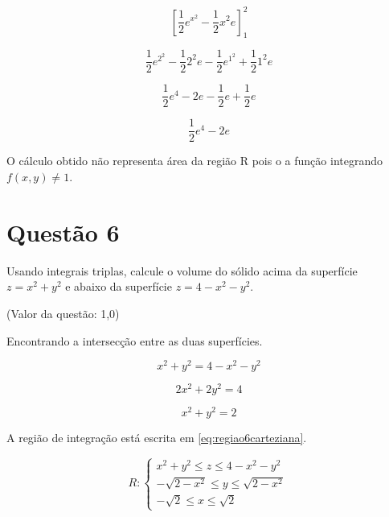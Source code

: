 \documentclass[10pt,a4paper]{article}
\begin{document}
	\begin{equation*}
		\left[ \frac{1}{2}e^{x^2} - \frac{1}{2}x^2 e \right]_1^2
	\end{equation*}
	
	\begin{equation*}
		\frac{1}{2}e^{2^2} - \frac{1}{2}2^2 e - \frac{1}{2}e^{1^2} + \frac{1}{2}1^2 e
	\end{equation*}
	
	\begin{equation*}
		\frac{1}{2}e^4 - 2 e - \frac{1}{2}e + \frac{1}{2} e
	\end{equation*}
	
	\begin{equation*}
		\frac{1}{2}e^4 - 2 e
	\end{equation*}
	
	O cálculo obtido não representa área da região R pois o a função integrando $f(x, y) \neq 1$.
	
	\section*{Questão 6}
	
	Usando integrais triplas, calcule o volume do sólido acima da superfície $ z = x^2 + y^2 $ e abaixo da superfície $ z = 4 - x^2 - y^2 $.
	
	(Valor da questão: 1,0)
	
	Encontrando a intersecção entre as duas superfícies.
	
	\begin{equation*}
		x^2 + y^2 = 4 - x^2 - y^2
	\end{equation*}
	
	\begin{equation*}
		2x^2 + 2y^2 = 4
	\end{equation*}
	
	\begin{equation*}
		x^2 + y^2 = 2
	\end{equation*}
	
	A região de integração está escrita em \ref{eq:regiao6carteziana}.
	
	\begin{equation}\label{eq:regiao6carteziana}
		R:
		\begin{cases}
			x^2 + y^2 \le z \le 4 - x^2 - y^2\\
			-\sqrt{2 - x^2} \le y \le \sqrt{2 - x^2}\\
			-\sqrt{2} \le x \le \sqrt{2}
		\end{cases}
	\end{equation}
	
\end{document}
